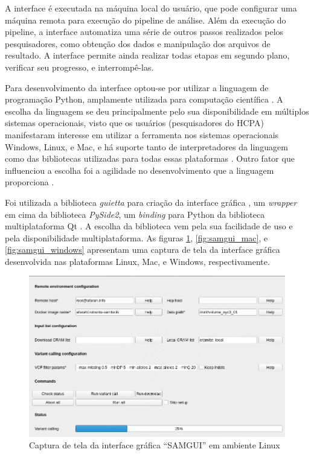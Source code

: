 \documentclass[cic,tc]{iiufrgs}
\begin{document}
A interface é executada na máquina local do usuário, que pode configurar uma
máquina remota para execução do pipeline de análise. Além da execução do
pipeline, a interface automatiza uma série de outros passos realizados pelos
pesquisadores, como obtenção dos dados e manipulação dos arquivos de resultado.
A interface permite ainda realizar todas etapas em segundo plano, verificar seu
progresso, e interrompê-las.

Para desenvolvimento da interface optou-se por utilizar a linguagem de
programação Python, amplamente utilizada para computação
científica \cite{oliphant2007python}. A escolha da linguagem se deu
principalmente pelo sua disponibilidade em múltiplos sistemas operacionais,
visto que os usuários (pesquisadores do HCPA) manifestaram interesse em
utilizar a ferramenta nos sistemas operacionais Windows, Linux, e Mac, e há
suporte tanto de interpretadores da linguagem como das bibliotecas utilizadas
para todas essas plataformas \cite{oliphant2007python}. Outro fator que
influenciou a escolha foi a agilidade no desenvolvimento que a linguagem
proporciona \cite{oliphant2007python}.

Foi utilizada a biblioteca \textit{guietta} para criação da interface
gráfica \cite{guietta}, um \textit{wrapper} em cima da biblioteca
\textit{PySide2}, um \textit{binding} para Python da biblioteca multiplataforma
Qt \cite{loganathan2013pyside}. A escolha da biblioteca vem pela sua facilidade
de uso e pela disponibilidade multiplataforma. As figuras
\ref{fig:samgui_linux}, \ref{fig:samgui_mac}, e \ref{fig:samgui_windows}
apresentam uma captura de tela da interface gráfica desenvolvida nas
plataformas Linux, Mac, e Windows, respectivamente.

\begin{figure}
  \caption{Captura de tela da interface gráfica ``SAMGUI'' em ambiente Linux}
    \begin{center}
      \includegraphics[width=0.85\linewidth]{img/samgui_linux.png}
    \end{center}
    \label{fig:samgui_linux}
\end{figure}
\end{document}
